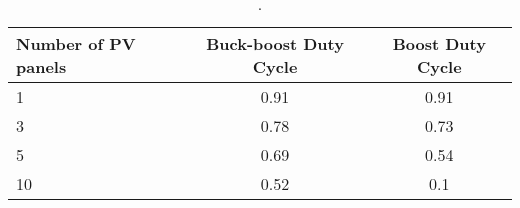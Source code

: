\begin{table}[H]
	\centering
	\begin{tabular}{ |l|c|c|} 
		\hline
		Number of PV panels & Buck-boost Duty Cycle & Boost Duty Cycle  \\ \hline
		1 & 0.91 & 0.91  \\ \hline
		3 & 0.78 & 0.73 \\ \hline
		5 &  0.69 & 0.54\\ \hline
		10 & 0.52 & 0.1  \\ \hline
	\end{tabular}
	\caption{.}
	\label{.}
\end{table}